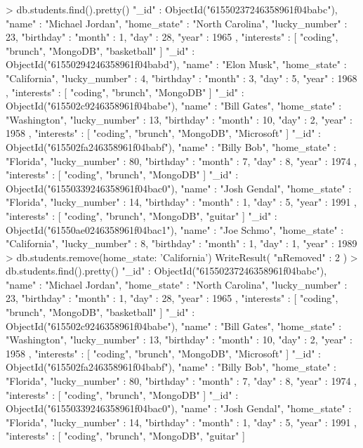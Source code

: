 > db.students.find().pretty()
{
	"_id" : ObjectId("61550237246358961f04babc"),
	"name" : "Michael Jordan",
	"home_state" : "North Carolina",
	"lucky_number" : 23,
	"birthday" : {
		"month" : 1,
		"day" : 28,
		"year" : 1965
	},
	"interests" : [
		"coding",
		"brunch",
		"MongoDB",
		"basketball"
	]
}
{
	"_id" : ObjectId("61550294246358961f04babd"),
	"name" : "Elon Musk",
	"home_state" : "California",
	"lucky_number" : 4,
	"birthday" : {
		"month" : 3,
		"day" : 5,
		"year" : 1968
	},
	"interests" : [
		"coding",
		"brunch",
		"MongoDB"
	]
}
{
	"_id" : ObjectId("615502c9246358961f04babe"),
	"name" : "Bill Gates",
	"home_state" : "Washington",
	"lucky_number" : 13,
	"birthday" : {
		"month" : 10,
		"day" : 2,
		"year" : 1958
	},
	"interests" : [
		"coding",
		"brunch",
		"MongoDB",
		"Microsoft"
	]
}
{
	"_id" : ObjectId("615502fa246358961f04babf"),
	"name" : "Billy Bob",
	"home_state" : "Florida",
	"lucky_number" : 80,
	"birthday" : {
		"month" : 7,
		"day" : 8,
		"year" : 1974
	},
	"interests" : [
		"coding",
		"brunch",
		"MongoDB"
	]
}
{
	"_id" : ObjectId("61550339246358961f04bac0"),
	"name" : "Josh Gendal",
	"home_state" : "Florida",
	"lucky_number" : 14,
	"birthday" : {
		"month" : 1,
		"day" : 5,
		"year" : 1991
	},
	"interests" : [
		"coding",
		"brunch",
		"MongoDB",
		"guitar"
	]
}
{
	"_id" : ObjectId("61550ae0246358961f04bac1"),
	"name" : "Joe Schmo",
	"home_state" : "California",
	"lucky_number" : 8,
	"birthday" : {
		"month" : 1,
		"day" : 1,
		"year" : 1989
	}
}
> db.students.remove({home_state: 'California'})
WriteResult({ "nRemoved" : 2 })
> db.students.find().pretty()
{
	"_id" : ObjectId("61550237246358961f04babc"),
	"name" : "Michael Jordan",
	"home_state" : "North Carolina",
	"lucky_number" : 23,
	"birthday" : {
		"month" : 1,
		"day" : 28,
		"year" : 1965
	},
	"interests" : [
		"coding",
		"brunch",
		"MongoDB",
		"basketball"
	]
}
{
	"_id" : ObjectId("615502c9246358961f04babe"),
	"name" : "Bill Gates",
	"home_state" : "Washington",
	"lucky_number" : 13,
	"birthday" : {
		"month" : 10,
		"day" : 2,
		"year" : 1958
	},
	"interests" : [
		"coding",
		"brunch",
		"MongoDB",
		"Microsoft"
	]
}
{
	"_id" : ObjectId("615502fa246358961f04babf"),
	"name" : "Billy Bob",
	"home_state" : "Florida",
	"lucky_number" : 80,
	"birthday" : {
		"month" : 7,
		"day" : 8,
		"year" : 1974
	},
	"interests" : [
		"coding",
		"brunch",
		"MongoDB"
	]
}
{
	"_id" : ObjectId("61550339246358961f04bac0"),
	"name" : "Josh Gendal",
	"home_state" : "Florida",
	"lucky_number" : 14,
	"birthday" : {
		"month" : 1,
		"day" : 5,
		"year" : 1991
	},
	"interests" : [
		"coding",
		"brunch",
		"MongoDB",
		"guitar"
	]
}
